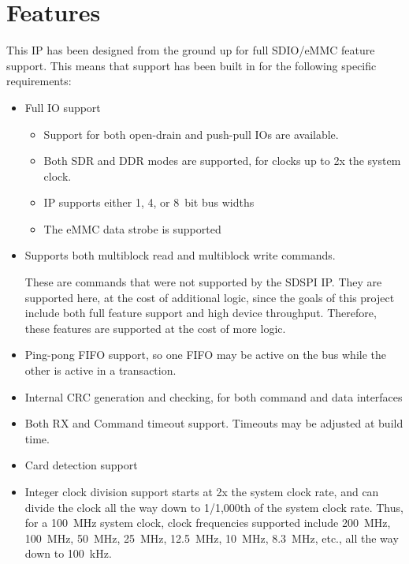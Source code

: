 \documentclass{gqtekspec}
\begin{document}
\chapter{Features}\label{ch:features}
This IP has been designed from the ground up for full SDIO/eMMC feature
support.  This means that support has been built in for the following
specific requirements:

\begin{itemize}
\item Full IO support
	\begin{itemize}
	\item Support for both open-drain and push-pull IOs are available.
	\item Both SDR and DDR modes are supported, for clocks up
		to 2x the system clock.
	\item IP supports either 1, 4, or 8~bit bus widths
	\item The eMMC data strobe is supported
	\end{itemize}	

\item Supports both multiblock read and multiblock write commands.

	These are commands that were not supported by the SDSPI IP.  They
	are supported here, at the cost of additional logic, since the
	goals of this project include both full feature support and high
	device throughput.  Therefore, these features are supported at the
	cost of more logic.

\item Ping-pong FIFO support, so one FIFO may be active on the bus while the
	other is active in a transaction.

\item Internal CRC generation and checking, for both command and data
	interfaces

\item Both RX and Command timeout support.  Timeouts may be adjusted at build
	time.

\item Card detection support

\item Integer clock division support starts at 2x the system clock rate,
	and can divide the clock all the way down to 1/1,000th of the system
	clock rate.  Thus, for a 100~MHz system clock, clock frequencies
	supported include 200~MHz, 100~MHz, 50~MHz, 25~MHz, 12.5~MHz, 10~MHz,
	8.3~MHz, etc.,  all the way down to 100~kHz.


\end{itemize}
\end{document}
